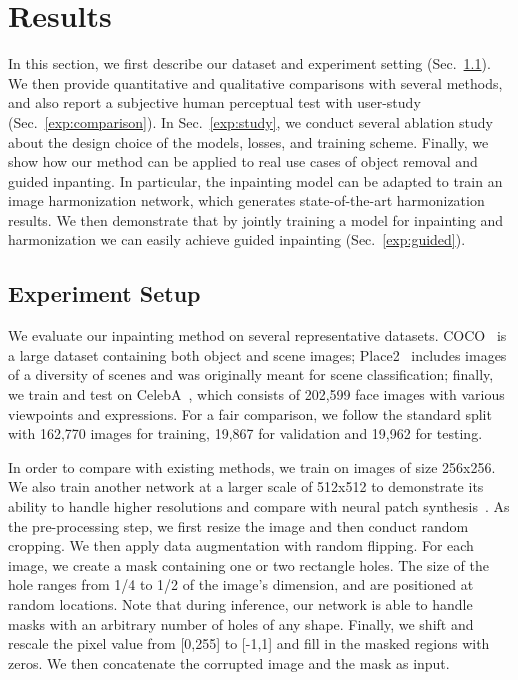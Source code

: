 \section{Results}
\label{sec:results}
In this section, we first describe our dataset and experiment setting (Sec.~\ref{exp:setup}). We then provide quantitative and qualitative comparisons with several methods, and also report a subjective human perceptual test with user-study (Sec.~\ref{exp:comparison}). In Sec.~\ref{exp:study}, we conduct several ablation study about the design choice of the models, losses, and training scheme. Finally, we show how our method can be applied to real use cases of object removal and guided inpanting. In particular, the inpainting model can be adapted to train an image harmonization network, which generates state-of-the-art harmonization results. We then demonstrate that by jointly training a model for inpainting and harmonization we can easily achieve guided inpainting (Sec.~\ref{exp:guided}).

\subsection{Experiment Setup}
\label{exp:setup}
We evaluate our inpainting method on several representative datasets. COCO~\cite{lin2014microsoft} is a large dataset containing both object and scene images; Place2~\cite{zhou2016places} includes images of a diversity of scenes and was originally meant for scene classification; finally, we train and test on CelebA~\cite{liu2015faceattributes}, which consists of 202,599 face images with various viewpoints and expressions. For a fair comparison, we follow the standard split with 162,770 images for training, 19,867 for validation and 19,962 for testing.

In order to compare with existing methods, we train on images of size 256x256. We also train another network at a larger scale of 512x512 to demonstrate its ability to handle higher resolutions and compare with neural patch synthesis~\cite{yang2017high}. As the pre-processing step, we first resize the image and then conduct random cropping. We then apply data augmentation with random flipping. For each image, we create a mask containing one or two rectangle holes. The size of the hole ranges from 1/4 to 1/2 of the image's dimension, and are positioned at random locations. Note that during inference, our network is able to handle masks with an arbitrary number of holes of any shape. Finally, we shift and rescale the pixel value from [0,255] to [-1,1] and fill in the masked regions with zeros. We then concatenate the corrupted image and the mask as input.

